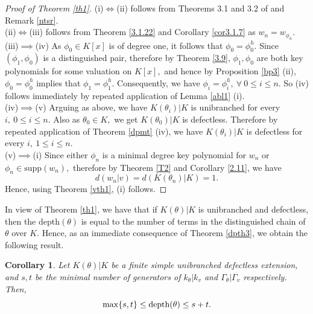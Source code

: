\documentclass[11pt]{amsart}
\newtheorem{corollary}[theorem]{Corollary}
\theoremstyle{definition}
\theoremstyle{remark}
\numberwithin{equation}{section}
\begin{document}
	 \begin{proof}[Proof of Theorem \ref{th1}]
	 	(i)$\iff $(ii) follows from Theorems 3.1 and 3.2 of \cite{SA1} and Remark \ref{ntsr}.\\ (ii)$\iff$(iii) follows from Theorem \ref{3.1.22} and Corollary \ref{cor3.1.7} as $w_n=w_{\phi_n}$.\\ (iii)$\implies$(iv) As $\phi_0\in K[x]$ is of degree one, it follows that $\phi_0=\phi_0^h.$ Since $(\phi_1,\phi_0)$ is a distinguished pair, therefore by Theorem \ref{3.9}, $\phi_1, \phi_0$ are both key polynomials for some valuation on $K[x],$ and hence by Proposition \ref{bp3} (ii), $\phi_0=\phi_0^h$ implies that $\phi_1=\phi_1^h.$ Consequently, we have $\phi_i=\phi_i^h,\ \forall \ 0\leq i \leq n.$  So (iv) follows immediately by repeated application of Lemma \ref{abl1} (i).\\
	 	(iv)$\implies$(v) Arguing as above, we have  $K(\theta_i)|K$ is unibranched for every $i,\ 0\leq i\leq n.$ Also as $\theta_0\in K,$ we get $K(\theta_0)|K$ is defectless. Therefore by repeated application of Theorem \ref{dpmt} (iv), we have $K(\theta_i)|K$ is defectless for every $i,\ 1\leq i\leq n.$ \\
	 	(v)$\implies$(i) Since either $\phi_n$ is a minimal degree key polynomial for $w_n$ or $\phi_n\in \text{supp}(w_n),$ therefore by Theorem \ref{T2} and Corollary \ref{2.11}, we have \[d(w_n|v)=d(K(\theta_n)|K)=1.\]  Hence, using Theorem \ref{vth1}, (i) follows.
	 	\end{proof}
	
	In view of Theorem \ref{th1}, we have that if $K(\theta)|K$ is unibranched and defectless, then the $\text{depth}(\theta)$ is equal to the number of terms in the distinguished chain of $\theta$ over $K.$ Hence, as an immediate consequence of Theorem \ref{dpth3}, we obtain the following result.
	
	\begin{corollary}
		Let $K(\theta)|K$ be a finite simple unibranched defectless extension, and $s, t$ be the minimal number of generators of $k_\theta|k_v$ and $\Gamma_\theta|\Gamma_v$ respectively. Then, \[\max\{s,t\}\leq \textup{depth}(\theta)\leq s+t.\]
	\end{corollary}
	
\end{document}
